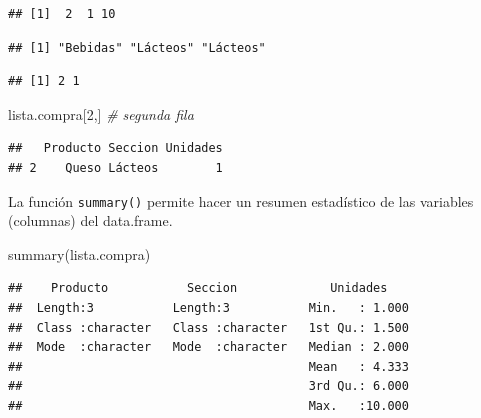 \documentclass[
]{book}
\newenvironment{Shaded}{\begin{snugshade}}{\end{snugshade}}
\newcommand{\CommentTok}[1]{\textcolor[rgb]{0.56,0.35,0.01}{\textit{#1}}}
\newcommand{\DecValTok}[1]{\textcolor[rgb]{0.00,0.00,0.81}{#1}}
\newcommand{\FunctionTok}[1]{\textcolor[rgb]{0.00,0.00,0.00}{#1}}
\newcommand{\NormalTok}[1]{#1}
\newcommand{\SpecialCharTok}[1]{\textcolor[rgb]{0.00,0.00,0.00}{#1}}
\theoremstyle{break}
\theoremstyle{nonumberplain}
\begin{document}
\begin{verbatim}
## [1]  2  1 10
\end{verbatim}

\begin{Shaded}
\end{Shaded}

\begin{verbatim}
## [1] "Bebidas" "Lácteos" "Lácteos"
\end{verbatim}

\begin{Shaded}
\end{Shaded}

\begin{verbatim}
## [1] 2 1
\end{verbatim}

\begin{Shaded}
\begin{Highlighting}[]
\NormalTok{lista.compra[}\DecValTok{2}\NormalTok{,]  }\CommentTok{\# segunda fila}
\end{Highlighting}
\end{Shaded}

\begin{verbatim}
##   Producto Seccion Unidades
## 2    Queso Lácteos        1
\end{verbatim}

La función \texttt{summary()} permite hacer un resumen estadístico de las
variables (columnas) del data.frame.

\begin{Shaded}
\begin{Highlighting}[]
\FunctionTok{summary}\NormalTok{(lista.compra)}
\end{Highlighting}
\end{Shaded}

\begin{verbatim}
##    Producto           Seccion             Unidades     
##  Length:3           Length:3           Min.   : 1.000  
##  Class :character   Class :character   1st Qu.: 1.500  
##  Mode  :character   Mode  :character   Median : 2.000  
##                                        Mean   : 4.333  
##                                        3rd Qu.: 6.000  
##                                        Max.   :10.000
\end{verbatim}
\end{document}
